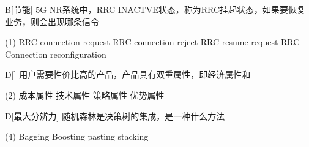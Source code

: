 

\begin{choice}{B}[节能]
    5G NR系统中，RRC INACTVE状态，称为RRC挂起状态，如果要恢复业务，则会出现哪条信令
    \begin{tasks}(1)
        \task RRC connection request
        \task RRC connection reject
        \task RRC resume request
        \task RRC Connection reconfiguration
    \end{tasks}
\end{choice}

\begin{choice}{D}[]
    用户需要性价比高的产品，产品具有双重属性，即经济属性和
    \begin{tasks}(2)
        \task 成本属性
        \task 技术属性
        \task 策略属性
        \task 优势属性
    \end{tasks}
\end{choice}




\begin{choice}{D}[最大分辨力]
    随机森林是决策树的集成，是一种什么方法
    \begin{tasks}(4)
        \task Bagging
        \task Boosting
        \task pasting
        \task stacking
    \end{tasks}
\end{choice}


